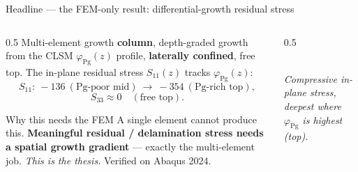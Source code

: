 \documentclass[aspectratio=169,xcolor=dvipsnames]{beamer}
\begin{document}
\begin{frame}{Headline — the FEM-only result: differential-growth residual stress}
\begin{columns}[T]
\begin{column}{0.5\textwidth}
\small
Multi-element growth \textbf{column}, depth-graded growth from the CLSM $\varphi_{\text{Pg}}(z)$
profile, \textbf{laterally confined}, free top. The in-plane residual stress $S_{11}(z)$ tracks
$\varphi_{\text{Pg}}(z)$:
\[
S_{11}\!:\ -136\ (\text{Pg-poor mid})\ \longrightarrow\ -354\ (\text{Pg-rich top}),
\]
\[
S_{33}\approx 0\quad(\text{free top}).
\]
\begin{block}{\small Why this needs the FEM}
\footnotesize A single element cannot produce this. \textbf{Meaningful residual / delamination stress
needs a spatial growth gradient} — exactly the multi-element job. \emph{This is the thesis.}
Verified on Abaqus 2024.
\end{block}
\end{column}
\begin{column}{0.5\textwidth}
\centering
{}
\\[-0.2em]
\footnotesize\textit{Compressive in-plane stress, deepest where $\varphi_{\text{Pg}}$ is highest (top).}
\end{column}
\end{columns}
\end{frame}
\end{document}
